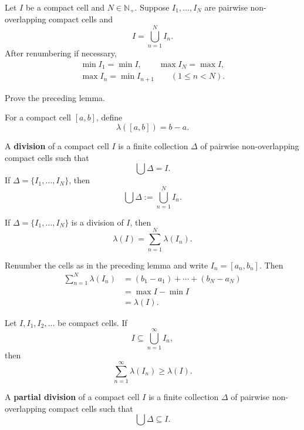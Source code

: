 \begin{lemmaenv}
Let $I$ be a compact cell and $N\in\mathbb N_+$. Suppose
$I_1,\ldots,I_N$ are pairwise non-overlapping compact cells and
\[
    I=\bigcup_{n=1}^{N}I_n.
\]
After renumbering if necessary,
\[
\begin{gathered}
    \min I_1=\min I,\qquad \max I_N=\max I,\\
    \max I_n=\min I_{n+1}\qquad(1\le n<N).
\end{gathered}
\]
\end{lemmaenv}

\begin{exerciseenv}
Prove the preceding lemma.
\end{exerciseenv}

\begin{definitionenv}
For a compact cell $[a,b]$, define
\[
    \lambda([a,b])=b-a.
\]
\end{definitionenv}

\begin{definitionenv}
A \textbf{division} of a compact cell $I$ is a finite collection
$\Delta$ of pairwise non-overlapping compact cells such that
\[
    \bigcup\Delta=I.
\]
If $\Delta=\{I_1,\ldots,I_N\}$, then
\[
    \bigcup\Delta:=\bigcup_{n=1}^{N}I_n.
\]
\end{definitionenv}

\begin{propositionenv}
If $\Delta=\{I_1,\ldots,I_N\}$ is a division of $I$, then
\[
    \lambda(I)=\sum_{n=1}^{N}\lambda(I_n).
\]
\end{propositionenv}

\begin{proofenv}
Renumber the cells as in the preceding lemma and write $I_n=[a_n,b_n]$.
Then
\[
\begin{aligned}
    \sum_{n=1}^{N}\lambda(I_n)
    &=(b_1-a_1)+\cdots+(b_N-a_N)\\
    &=\max I-\min I\\
    &=\lambda(I).
\end{aligned}
\]
\end{proofenv}

\begin{theoremenv}[Borel]
Let $I,I_1,I_2,\ldots$ be compact cells. If
\[
    I\subseteq\bigcup_{n=1}^{\infty}I_n,
\]
then
\[
    \sum_{n=1}^{\infty}\lambda(I_n)\ge\lambda(I).
\]
\end{theoremenv}

\begin{definitionenv}
A \textbf{partial division} of a compact cell $I$ is a finite collection
$\Delta$ of pairwise non-overlapping compact cells such that
\[
    \bigcup\Delta\subseteq I.
\]
\end{definitionenv}

